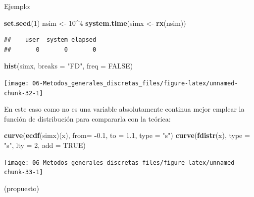 \documentclass[]{book}
\newenvironment{Shaded}{\begin{snugshade}}{\end{snugshade}}
\newcommand{\KeywordTok}[1]{\textcolor[rgb]{0.13,0.29,0.53}{\textbf{#1}}}
\newcommand{\DataTypeTok}[1]{\textcolor[rgb]{0.13,0.29,0.53}{#1}}
\newcommand{\DecValTok}[1]{\textcolor[rgb]{0.00,0.00,0.81}{#1}}
\newcommand{\FloatTok}[1]{\textcolor[rgb]{0.00,0.00,0.81}{#1}}
\newcommand{\StringTok}[1]{\textcolor[rgb]{0.31,0.60,0.02}{#1}}
\newcommand{\OtherTok}[1]{\textcolor[rgb]{0.56,0.35,0.01}{#1}}
\newcommand{\OperatorTok}[1]{\textcolor[rgb]{0.81,0.36,0.00}{\textbf{#1}}}
\newcommand{\NormalTok}[1]{#1}
\theoremstyle{definition}
\theoremstyle{definition}
\theoremstyle{definition}
\theoremstyle{remark}
\let\BeginKnitrBlock\begin \let\EndKnitrBlock\end
\begin{document}
\begin{enumerate}
  Ejemplo:

\begin{Shaded}
\begin{Highlighting}[]
\KeywordTok{set.seed}\NormalTok{(}\DecValTok{1}\NormalTok{)}
\NormalTok{nsim <-}\StringTok{ }\DecValTok{10}\OperatorTok{^}\DecValTok{4}
\KeywordTok{system.time}\NormalTok{(simx <-}\StringTok{ }\KeywordTok{rx}\NormalTok{(nsim))}
\end{Highlighting}
\end{Shaded}

\begin{verbatim}
##    user  system elapsed 
##       0       0       0
\end{verbatim}

\begin{Shaded}
\begin{Highlighting}[]
\KeywordTok{hist}\NormalTok{(simx, }\DataTypeTok{breaks =} \StringTok{"FD"}\NormalTok{, }\DataTypeTok{freq =} \OtherTok{FALSE}\NormalTok{)}
\end{Highlighting}
\end{Shaded}

  \begin{center}\texttt{[image: 06-Metodos\_generales\_discretas\_files/figure-latex/unnamed-chunk-32-1]} \end{center}

  En este caso como no es una variable absolutamente continua mejor
  emplear la función de distribución para compararla con la teórica:

\begin{Shaded}
\begin{Highlighting}[]
\KeywordTok{curve}\NormalTok{(}\KeywordTok{ecdf}\NormalTok{(simx)(x), }\DataTypeTok{from=} \OperatorTok{-}\FloatTok{0.1}\NormalTok{, }\DataTypeTok{to =} \FloatTok{1.1}\NormalTok{, }\DataTypeTok{type =} \StringTok{"s"}\NormalTok{)}
\KeywordTok{curve}\NormalTok{(}\KeywordTok{fdistr}\NormalTok{(x), }\DataTypeTok{type =} \StringTok{"s"}\NormalTok{, }\DataTypeTok{lty =} \DecValTok{2}\NormalTok{, }\DataTypeTok{add =} \OtherTok{TRUE}\NormalTok{)}
\end{Highlighting}
\end{Shaded}

  \begin{center}\texttt{[image: 06-Metodos\_generales\_discretas\_files/figure-latex/unnamed-chunk-33-1]} \end{center}
\end{enumerate}

\BeginKnitrBlock{exercise}
\protect\hypertarget{exr:unnamed-chunk-34}{}{\label{exr:unnamed-chunk-34}
}(propuesto)
\EndKnitrBlock{exercise}
\end{document}

